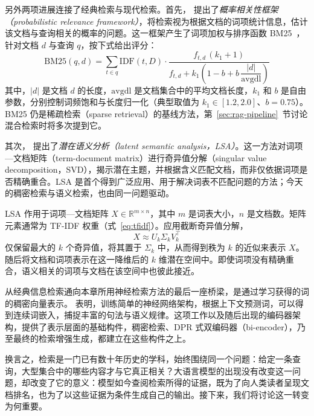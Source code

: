 另外两项进展连接了经典检索与现代检索。首先，\citet{robertson2009probabilistic} 提出了\emph{概率相关性框架（probabilistic relevance framework）}，将检索视为根据文档的词项统计信息，估计该文档与查询相关的概率的问题。这一框架产生了词项加权与排序函数 BM25~\cite{robertson1994okapi}，针对文档 $d$ 与查询 $q$，按下式给出评分：
\begin{equation}
\mathrm{BM25}(q,d) = \sum_{t \in q} \mathrm{IDF}(t,D) \cdot
\frac{f_{t,d} \, (k_1 + 1)}{f_{t,d} + k_1 \left(1 - b + b \, \dfrac{|d|}{\mathrm{avgdl}}\right)}
\label{eq:bm25}
\end{equation}
其中，$|d|$ 是文档 $d$ 的长度，$\mathrm{avgdl}$ 是文档集合中的平均文档长度，$k_1$ 和 $b$ 是自由参数，分别控制词频饱和与长度归一化（典型取值为 $k_1 \in [1.2, 2.0]$、$b = 0.75$）。BM25 仍是稀疏检索（sparse retrieval）的基线方法，第~\ref{sec:rag-pipeline}~节讨论混合检索时将多次提到它。

其次，\citet{deerwester1990indexing} 提出了\emph{潜在语义分析（latent semantic analysis，LSA）}。这一方法对词项—文档矩阵（term-document matrix）进行奇异值分解（singular value decomposition，SVD），揭示潜在主题，并根据含义匹配文档，而非仅依据词项是否精确重合。LSA 是首个得到广泛应用、用于解决词表不匹配问题的方法；今天的稠密检索与语义检索，也由同一问题驱动。

LSA 作用于词项—文档矩阵 $X \in \mathbb{R}^{m \times n}$，其中 $m$ 是词表大小，$n$ 是文档数。矩阵元素通常为 TF-IDF 权重（式~\ref{eq:tfidf}）。应用截断奇异值分解，
\begin{equation}
X \approx U_k \Sigma_k V_k^{\top}
\label{eq:lsa}
\end{equation}
仅保留最大的 $k$ 个奇异值，将其置于 $\Sigma_k$ 中，从而得到秩为 $k$ 的近似来表示 $X$。随后将文档和词项表示在这一降维后的 $k$ 维潜在空间中。即使词项没有精确重合，语义相关的词项与文档在该空间中也彼此接近。


从经典信息检索通向本章所用神经检索方法的最后一座桥梁，是通过学习获得的词的稠密向量表示。\citet{mikolov2013efficient} 表明，训练简单的神经网络架构，根据上下文预测词，可以得到连续词嵌入，捕捉丰富的句法与语义规律。这项工作以及随后出现的编码器架构，提供了表示层面的基础构件，稠密检索、DPR 式双编码器（bi-encoder），乃至最终的检索增强生成，都建立在这些构件之上。

换言之，检索是一门已有数十年历史的学科，始终围绕同一个问题：给定一条查询，大型集合中的哪些内容才与它真正相关？大语言模型的出现没有改变这一问题，却改变了它的意义：模型如今查阅检索所得的证据，既为了向人类读者呈现文档排名，也为了以这些证据为条件生成自己的输出。接下来，我们将讨论这一转变为何重要。


